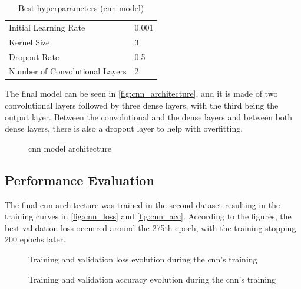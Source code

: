 \begin{table}[ht]
    \centering
    \caption{Best hyperparameters (\acs{cnn} model)}
    \label{table:cnn_best_hyperparameters}
    \begin{tabular}{ll}
        \toprule
        Initial Learning Rate & 0.001 \\
        Kernel Size & 3 \\
        Dropout Rate & 0.5 \\
        Number of Convolutional Layers & 2 \\
        \bottomrule
    \end{tabular}
\end{table}

The final model can be seen in \autoref{fig:cnn_architecture}, and it is made of two convolutional layers followed by three dense layers, with the third being the output layer. Between the convolutional and the dense layers and between both dense layers, there is also a dropout layer to help with overfitting.

\begin{figure}[ht]
    \centering
    {\fontsize{10}{12}\selectfont}
    \caption{\acs{cnn} model architecture}
    \label{fig:cnn_architecture}
\end{figure}

\subsection{Performance Evaluation}

The final \acs{cnn} architecture was trained in the second dataset resulting in the training curves in \autoref{fig:cnn_loss} and \autoref{fig:cnn_acc}. According to the figures, the best validation loss occurred around the 275th epoch, with the training stopping 200 epochs later.

\begin{figure}[ht]
    \centering
    {\fontsize{10}{12}\selectfont}
    \caption{Training and validation loss evolution during the \acs{cnn}'s training}
    \label{fig:cnn_loss}
\end{figure}

\begin{figure}[ht]
    \centering
    {\fontsize{10}{12}\selectfont}
    \caption{Training and validation accuracy evolution during the \acs{cnn}'s training}
    \label{fig:cnn_acc}
\end{figure}

